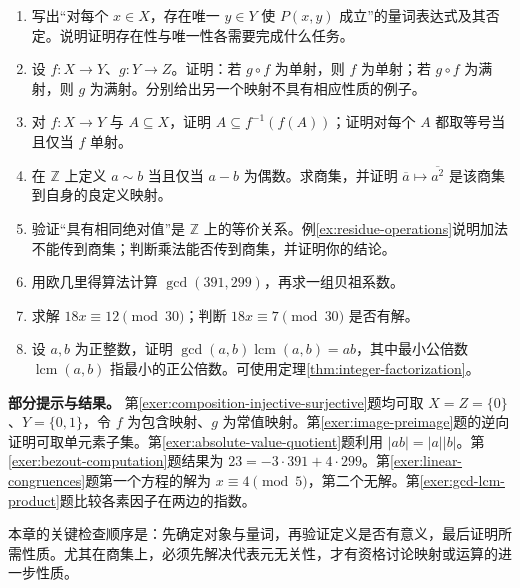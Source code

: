 \begin{enumerate}
  \item\label{exer:quantifier-uniqueness} 写出“对每个 $x\in X$，存在唯一 $y\in Y$ 使 $P(x,y)$ 成立”的量词表达式及其否定。说明证明存在性与唯一性各需要完成什么任务。
  \item\label{exer:composition-injective-surjective} 设 $f:X\to Y$、$g:Y\to Z$。证明：若 $g\circ f$ 为单射，则 $f$ 为单射；若 $g\circ f$ 为满射，则 $g$ 为满射。分别给出另一个映射不具有相应性质的例子。
  \item\label{exer:image-preimage} 对 $f:X\to Y$ 与 $A\subseteq X$，证明 $A\subseteq f^{-1}(f(A))$；证明对每个 $A$ 都取等号当且仅当 $f$ 单射。
  \item\label{exer:quotient-square-map} 在 $\mathbb Z$ 上定义 $a\sim b$ 当且仅当 $a-b$ 为偶数。求商集，并证明 $\overline a\mapsto\overline{a^2}$ 是该商集到自身的良定义映射。
  \item\label{exer:absolute-value-quotient} 验证“具有相同绝对值”是 $\mathbb Z$ 上的等价关系。例\ref{ex:residue-operations}说明加法不能传到商集；判断乘法能否传到商集，并证明你的结论。
  \item\label{exer:bezout-computation} 用欧几里得算法计算 $\gcd(391,299)$，再求一组贝祖系数。
  \item\label{exer:linear-congruences} 求解 $18x\equiv12\pmod{30}$；判断 $18x\equiv7\pmod{30}$ 是否有解。
  \item\label{exer:gcd-lcm-product} 设 $a,b$ 为正整数，证明 $\gcd(a,b)\operatorname{lcm}(a,b)=ab$，其中最小公倍数 $\operatorname{lcm}(a,b)$ 指最小的正公倍数。可使用定理\ref{thm:integer-factorization}。
\end{enumerate}

\textbf{部分提示与结果。} 第\ref{exer:composition-injective-surjective}题均可取 $X=Z=\{0\}$、$Y=\{0,1\}$，令 $f$ 为包含映射、$g$ 为常值映射。第\ref{exer:image-preimage}题的逆向证明可取单元素子集。第\ref{exer:absolute-value-quotient}题利用 $|ab|=|a||b|$。第\ref{exer:bezout-computation}题结果为 $23=-3\cdot391+4\cdot299$。第\ref{exer:linear-congruences}题第一个方程的解为 $x\equiv4\pmod5$，第二个无解。第\ref{exer:gcd-lcm-product}题比较各素因子在两边的指数。

本章的关键检查顺序是：先确定对象与量词，再验证定义是否有意义，最后证明所需性质。尤其在商集上，必须先解决代表元无关性，才有资格讨论映射或运算的进一步性质。


